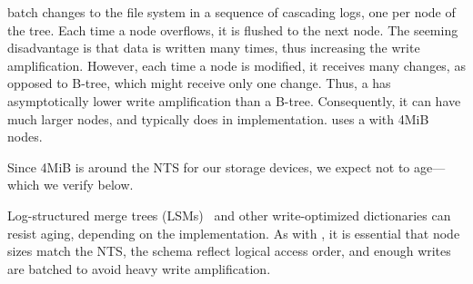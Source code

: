   \bets batch changes to the file system in a
sequence of cascading logs, one per node of the tree.  Each time a
node overflows, it is flushed to the next node.  The seeming
disadvantage is that data is written many times, thus increasing the
write amplification.  However, each time a node is modified, it
receives many changes, as opposed to B-tree, which might receive only
one change.  Thus, a \bet has asymptotically lower write amplification
than a B-tree.  Consequently, it can have much larger nodes, and
typically does in implementation.  \betrfs uses a \bet with 4MiB nodes.  

Since 4MiB is around the NTS for our storage devices,
we expect \betrfs not to age---which we verify below.

Log-structured merge trees (LSMs)~\cite{OneilChGa96} and other write-optimized
dictionaries can resist aging, depending on the implementation.
As with \bets, it is essential that node sizes match the NTS, the schema reflect logical access order, and enough 
writes are batched to avoid heavy write amplification.  



\iffalse
In order for small writes and updates to be performed without writing entire
blocks, these operations can be batched together into larger writes. This issue
then becomes how to make sure these writes maintain some sort of overarching logical order
to ensure efficient searches of the written data.
Here a write-optimized dictionary,
such as a \bet or \lsm, provides a theoretical solution.

\fi

\begin{comment}
\tightpara{Log-Structured File Systems}
The general principle behind log-structured file systems is that very little
logical or sequential order in maintained. Thus log-structured file systems
will become fragmented and aged under all but the most trivial workloads.
\end{comment}


